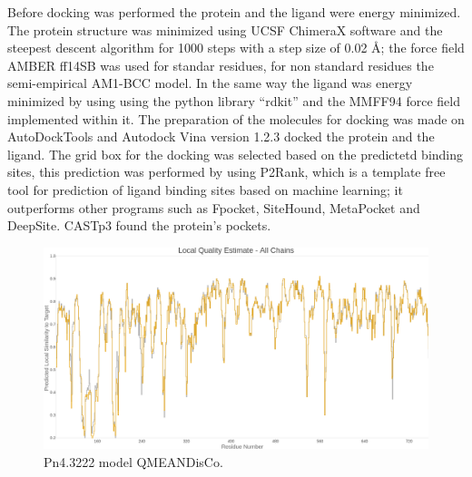 \documentclass[12pt]{article}
\begin{document}
	Before docking was performed the protein and the ligand were energy minimized. The protein structure was minimized using UCSF ChimeraX software \cite{chimera,chimera_2} and the steepest descent algorithm for 1000 steps with a step size of 0.02 \r{A}; the force field AMBER ff14SB was used for standar residues, for non standard residues the semi-empirical AM1-BCC model. \cite{am1_bcc,am1_bcc_2,am1_bcc_3} In the same way the ligand was energy minimized by using using the python library ``rdkit'' and the MMFF94 force field implemented within it. \cite{rdkit,rdkit_mmff}	The preparation of the molecules for docking was made on AutoDockTools and Autodock Vina version 1.2.3 docked the protein and the ligand. \cite{adt,vina,vina_2} The grid box for the docking was selected based on the predictetd binding sites, this prediction was performed by using P2Rank, which is a template free tool for prediction of ligand binding sites based on machine learning; it outperforms other programs such as Fpocket, SiteHound, MetaPocket and DeepSite. \cite{krivak2018p2rank} CASTp3 found the protein's pockets.
	
	\FloatBarrier
	\begin{figure}
		\centering
		\includegraphics[width=\textwidth-50pt]{../8/Swiss/Local_quality_estimate.png}
		\caption{\centering Pn4.3222 model QMEANDisCo.}
		\label{fig8_2}
	\end{figure}
	\FloatBarrier
	
\end{document}
